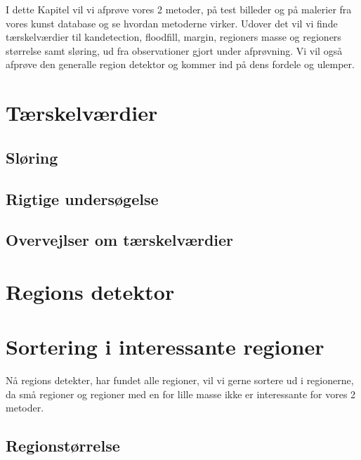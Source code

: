 {
{\sffamily
I dette Kapitel vil vi afprøve vores 2 metoder, på test billeder og på
malerier fra vores kunst database og se hvordan metoderne virker. Udover
det vil vi finde tærskelværdier til kandetection, floodfill, margin,
regioners masse og regioners størrelse samt sløring, ud fra observationer
gjort under afprøvning. Vi vil også afprøve den generalle region
detektor og kommer ind på dens fordele og ulemper.}

\section{Tærskelværdier\label{terskelverdi}}

\clearpage

\subsection{Sløring}

\clearpage

\subsection{Rigtige undersøgelse}


\subsection{Overvejlser om tærskelværdier}


\section{Regions detektor\label{region_detektor}}

\clearpage


\section{Sortering i interessante regioner}
{\sffamily 
Nå regions detekter, har fundet alle regioner, vil vi gerne sortere ud i
regionerne, da små regioner og regioner med en for lille masse ikke er
interessante for vores 2 metoder.
}


\subsection{Regionstørrelse \label{region_stoerlse}}

\clearpage

}
